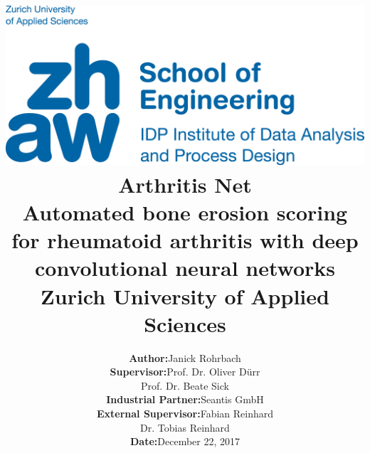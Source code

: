 \documentclass[12pt]{article}
\begin{document}
\title{
\vspace{-2.0cm}
\includegraphics{zhaw}\\ 
\vspace{2cm}
\textbf{Arthritis Net}\\
\vspace{1cm}
\Large Automated bone erosion scoring for rheumatoid arthritis with deep convolutional neural networks\\
\vspace{1cm}
{\Large Zurich University of Applied Sciences}}
\author{\begin{tabular}{rl}
  \textbf{Author:} & Janick Rohrbach \\
  \textbf{Supervisor:} & Prof. Dr. Oliver Dürr \\ & Prof. Dr. Beate Sick \\
  \textbf{Industrial Partner:} & Seantis GmbH \\
  \textbf{External Supervisor:} & Fabian Reinhard \\ & Dr. Tobias Reinhard \\
  \textbf{Date:} & December 22, 2017 \\
  \hspace{6.0cm} & \hspace{6.0cm}
\end{tabular}}
\date{}
\maketitle

\newpage
\end{document}
